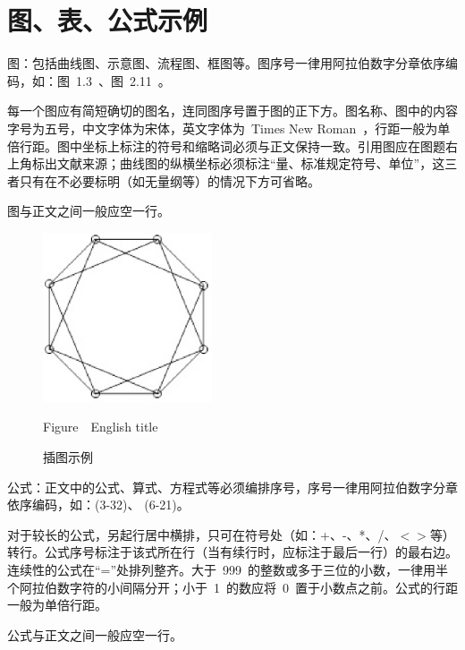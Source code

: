 
\chapter{图、表、公式示例}

图：包括曲线图、示意图、流程图、框图等。图序号一律用阿拉伯数字分章依序编码，如：图~1.3~、图~2.11~。

每一个图应有简短确切的图名，连同图序号置于图的正下方。图名称、图中的内容字号为五号，中文字体为宋体，英文字体为~Times New Roman~，行距一般为单倍行距。图中坐标上标注的符号和缩略词必须与正文保持一致。引用图应在图题右上角标出文献来源；曲线图的纵横坐标必须标注“量、标准规定符号、单位”，这三者只有在不必要标明（如无量纲等）的情况下方可省略。

图与正文之间一般应空一行。

\begin{figure}[!h]
  \centering
  \setlength{\abovecaptionskip}{2pt}
  \setlength{\belowcaptionskip}{2pt}
  \includegraphics[height=5cm ,width=5cm]{figures/fig.eps}
  \caption{插图示例}
  \label{Figure:4-1}
  Figure\ \thefigure \ English title
\end{figure}

公式：正文中的公式、算式、方程式等必须编排序号，序号一律用阿拉伯数字分章依序编码，如：(3-32)、 (6-21)。

对于较长的公式，另起行居中横排，只可在符号处（如：+、-、*、/、$<$$>$等）转行。公式序号标注于该式所在行（当有续行时，应标注于最后一行）的最右边。连续性的公式在“=”处排列整齐。大于~999~的整数或多于三位的小数，一律用半个阿拉伯数字符的小间隔分开；小于~1~的数应将~0~置于小数点之前。公式的行距一般为单倍行距。

公式与正文之间一般应空一行。

